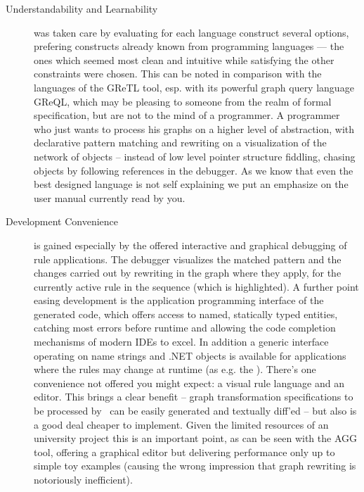 \begin{description}
\item[Understandability and Learnability]
was taken care by evaluating for each language construct several options,
prefering constructs already known from programming languages ---
the ones which seemed most clean and intuitive while satisfying the other constraints were chosen.
This can be noted in comparison with the languages of the GReTL \cite{GReTL} tool, esp. with its powerful graph query language GReQL,
which may be pleasing to someone from the realm of formal specification, but are not to the mind of a programmer.
A programmer who just wants to process his graphs on a higher level of abstraction, with declarative pattern matching and rewriting on a visualization of the network of objects -- instead of low level pointer structure fiddling, chasing objects by following references in the debugger.
As we know that even the best designed language is not self explaining we put an emphasize on the user manual currently read by you.

\item[Development Convenience]
is gained especially by the offered interactive and graphical debugging of rule applications.
The debugger visualizes the matched pattern and the changes carried out by rewriting in the graph where they apply,
for the currently active rule in the sequence (which is highlighted).
A further point easing development is the application programming interface of the generated code,
which offers access to named, statically typed entities, catching most errors before runtime and allowing the code completion mechanisms of modern IDEs to excel.
In addition a generic interface operating on name strings and .NET objects is available for applications where the rules may change at runtime (as e.g. the \GrShell).
There's one convenience not offered you might expect: a visual rule language and an editor.
This brings a clear benefit -- graph transformation specifications to be processed by \GrG\ can be easily generated and textually diff'ed --
but also is a good deal cheaper to implement.
Given the limited resources of an university project this is an important point,
as can be seen with the AGG\cite{agg} tool, offering a graphical editor but delivering performance only up to simple toy examples
(causing the wrong impression that graph rewriting is notoriously inefficient).


\end{description}
